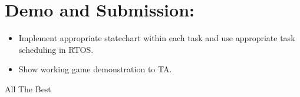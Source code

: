 \documentclass{article}
\begin{document}
\section{Demo and Submission:}
\begin{itemize}
    \item Implement appropriate statechart within each task and use appropriate task scheduling in RTOS.
    \item Show working game demonstration to TA.
\end{itemize}
\begin{center}
\newline
   All The Best

 \end{center}
\end{document}
